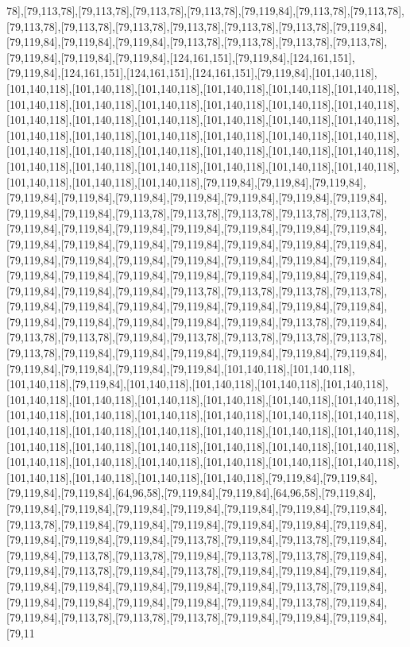 78],[79,113,78],[79,113,78],[79,113,78],[79,113,78],[79,119,84],[79,113,78],[79,113,78],[79,113,78],[79,113,78],[79,113,78],[79,113,78],[79,113,78],[79,113,78],[79,119,84],[79,119,84],[79,119,84],[79,119,84],[79,113,78],[79,113,78],[79,113,78],[79,113,78],[79,119,84],[79,119,84],[79,119,84],[124,161,151],[79,119,84],[124,161,151],[79,119,84],[124,161,151],[124,161,151],[124,161,151],[79,119,84],[101,140,118],[101,140,118],[101,140,118],[101,140,118],[101,140,118],[101,140,118],[101,140,118],[101,140,118],[101,140,118],[101,140,118],[101,140,118],[101,140,118],[101,140,118],[101,140,118],[101,140,118],[101,140,118],[101,140,118],[101,140,118],[101,140,118],[101,140,118],[101,140,118],[101,140,118],[101,140,118],[101,140,118],[101,140,118],[101,140,118],[101,140,118],[101,140,118],[101,140,118],[101,140,118],[101,140,118],[101,140,118],[101,140,118],[101,140,118],[101,140,118],[101,140,118],[101,140,118],[101,140,118],[101,140,118],[101,140,118],[79,119,84],[79,119,84],[79,119,84],[79,119,84],[79,119,84],[79,119,84],[79,119,84],[79,119,84],[79,119,84],[79,119,84],[79,119,84],[79,119,84],[79,113,78],[79,113,78],[79,113,78],[79,113,78],[79,113,78],[79,119,84],[79,119,84],[79,119,84],[79,119,84],[79,119,84],[79,119,84],[79,119,84],[79,119,84],[79,119,84],[79,119,84],[79,119,84],[79,119,84],[79,119,84],[79,119,84],[79,119,84],[79,119,84],[79,119,84],[79,119,84],[79,119,84],[79,119,84],[79,119,84],[79,119,84],[79,119,84],[79,119,84],[79,119,84],[79,119,84],[79,119,84],[79,119,84],[79,119,84],[79,119,84],[79,119,84],[79,113,78],[79,113,78],[79,113,78],[79,113,78],[79,119,84],[79,119,84],[79,119,84],[79,119,84],[79,119,84],[79,119,84],[79,119,84],[79,119,84],[79,119,84],[79,119,84],[79,119,84],[79,119,84],[79,113,78],[79,119,84],[79,113,78],[79,113,78],[79,119,84],[79,113,78],[79,113,78],[79,113,78],[79,113,78],[79,113,78],[79,119,84],[79,119,84],[79,119,84],[79,119,84],[79,119,84],[79,119,84],[79,119,84],[79,119,84],[79,119,84],[79,119,84],[101,140,118],[101,140,118],[101,140,118],[79,119,84],[101,140,118],[101,140,118],[101,140,118],[101,140,118],[101,140,118],[101,140,118],[101,140,118],[101,140,118],[101,140,118],[101,140,118],[101,140,118],[101,140,118],[101,140,118],[101,140,118],[101,140,118],[101,140,118],[101,140,118],[101,140,118],[101,140,118],[101,140,118],[101,140,118],[101,140,118],[101,140,118],[101,140,118],[101,140,118],[101,140,118],[101,140,118],[101,140,118],[101,140,118],[101,140,118],[101,140,118],[101,140,118],[101,140,118],[101,140,118],[101,140,118],[101,140,118],[101,140,118],[101,140,118],[79,119,84],[79,119,84],[79,119,84],[79,119,84],[64,96,58],[79,119,84],[79,119,84],[64,96,58],[79,119,84],[79,119,84],[79,119,84],[79,119,84],[79,119,84],[79,119,84],[79,119,84],[79,119,84],[79,113,78],[79,119,84],[79,119,84],[79,119,84],[79,119,84],[79,119,84],[79,119,84],[79,119,84],[79,119,84],[79,119,84],[79,113,78],[79,119,84],[79,113,78],[79,119,84],[79,119,84],[79,113,78],[79,113,78],[79,119,84],[79,113,78],[79,113,78],[79,119,84],[79,119,84],[79,113,78],[79,119,84],[79,113,78],[79,119,84],[79,119,84],[79,119,84],[79,119,84],[79,119,84],[79,119,84],[79,119,84],[79,119,84],[79,113,78],[79,119,84],[79,119,84],[79,119,84],[79,119,84],[79,119,84],[79,119,84],[79,113,78],[79,119,84],[79,119,84],[79,113,78],[79,113,78],[79,113,78],[79,119,84],[79,119,84],[79,119,84],[79,11